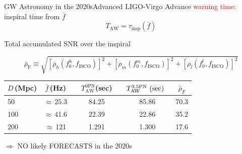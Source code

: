 \documentclass[xcolor=dvipsnames,handout,t]{beamer}
\newcommand{\red}[1]{\textcolor{red}{#1}}
\newcommand\T{\rule{0pt}{2.6ex}}       %
\newcommand\B{\rule[-1.2ex]{0pt}{0pt}} %
\begin{document}
\begin{frame}{GW Astronomy in the 2020s}{Advanced LIGO-Virgo}
  Advance \red{warning time}: inspiral time from $\bar{f}$
  \[
    T_\text{AW} = \tau_\text{insp}(\bar{f})
  \]
  {
    Total accumulated SNR over the inspiral
    \begin{footnotesize}
      \[
      \bar{\rho}_\text{F}\equiv\sqrt{\left[{\rho}_h(f_0^h,{f}_\text{ISCO})\right]^2+\left[{\rho}_m(f_0^m,{f}_\text{ISCO})\right]^2+\left[{\rho}_l(f_0^l,{f}_\text{ISCO})\right]^2}
      \]
      \begin{table}[h]
	\centering
	\begin{tabular}{lcccccc}
	  \hline\hline
	  $D\,$(Mpc) & $\bar{f}\,$(Hz) &{}& $T^\text{0PN}_\text{AW}$(sec) &\hspace{1mm} & $T^\text{3.5PN}_\text{AW}\text{ (sec)}\hspace{2mm}$& $\bar{\rho}_F$\T \B \\
	  \hline
	  50 & $\approx\,$25.3 & & 84.25 & & 85.86 & 70.3 \\
	  100 & $\approx\,$41.6 & & 22.39 & & 22.86 & 35.2 \\
	  200 & $\approx\,$121 & & 1.291 &\quad & 1.300 & 17.6 \\
	  \hline\hline
	\end{tabular}
      \end{table}
    \end{footnotesize}
  }
%
$\Longrightarrow$ NO likely FORECASTS  in the 2020s

\end{frame}
\end{document}

